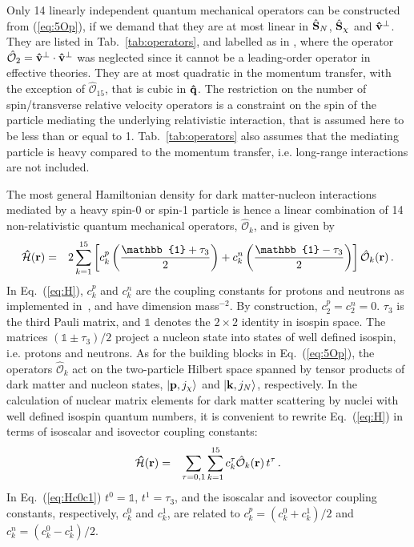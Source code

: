 \documentclass[11pt,a4paper]{article}
\begin{document}
Only 14 linearly independent quantum mechanical operators can be constructed from (\ref{eq:5Op}), if we demand that they are at most linear in $\hat{{\bf{S}}}_N$, $\hat{{\bf{S}}}_\chi$ and $\bf{\hat{v}^{\perp}}$. They are listed in Tab.~\ref{tab:operators}, and labelled as in \cite{Anand:2013yka}, where the operator $\hat{\mathcal{O}}_2={\bf{\hat{v}}}^{\perp}\cdot{\bf{\hat{v}}}^{\perp}$ was neglected since it cannot be a leading-order operator in effective theories. They are at most quadratic in the momentum transfer, with the exception of $\hat{\mathcal{O}}_{15}$, that is cubic in ${\bf{\hat{q}}}$. The restriction on the number of spin/transverse relative velocity operators is a constraint on the spin of the particle mediating the underlying relativistic interaction, that is assumed here to be less than or equal to 1. Tab.~\ref{tab:operators} also assumes that the mediating particle is heavy compared to the momentum transfer, i.e. long-range interactions are not included. 

The most general Hamiltonian density for dark matter-nucleon interactions mediated by a heavy spin-0 or spin-1 particle is hence a linear combination of 14 non-relativistic quantum mechanical operators, $\hat{\mathcal{O}}_k$, and is given by
\begin{eqnarray}
{\bf\hat{\mathcal{H}}}({\bf{r}}) &=& 2 \sum_{k=1}^{15} \left[ c_k^{p} \left( \frac{\mathbb{1}+ \tau_3}{2} \right) + c_k^{n} \left( \frac{\mathbb{1} - \tau_3}{2} \right) \right] \hat{\mathcal{O}}_{k}({\bf{r}}) \,.
\label{eq:H}
\end{eqnarray}
In Eq.~(\ref{eq:H}), $c^{p}_k$ and $c^{n}_k$ are the coupling constants for protons and neutrons as implemented in~\cite{Anand:2013yka}, and have dimension mass$^{-2}$. By construction, $c_2^p=c_2^n=0$. $\tau_3$ is the third Pauli matrix, and $\mathbb{1}$ denotes the $2\times2$ identity in isospin space. The matrices $(\mathbb{1} \pm \tau_{3})/2$ project a nucleon state into states of well defined isospin, i.e. protons and neutrons. As for the building blocks in Eq.~(\ref{eq:5Op}), the operators $\hat{\mathcal{O}}_k$ act on the two-particle Hilbert space spanned by tensor products of dark matter and nucleon states, $|{\bf p},j_\chi\rangle$ and $|{\bf k},j_N\rangle$, respectively. In the calculation of nuclear matrix elements for dark matter scattering by nuclei with well defined isospin quantum numbers, it is convenient to rewrite Eq.~(\ref{eq:H}) in terms of isoscalar and isovector coupling constants:
\begin{eqnarray}
{\bf\hat{\mathcal{H}}}({\bf{r}})&=& \sum_{\tau=0,1} \sum_{k=1}^{15} c_k^{\tau} \hat{\mathcal{O}}_{k}({\bf{r}}) \, t^{\tau} \,.
\label{eq:Hc0c1}
\end{eqnarray}
In Eq.~(\ref{eq:Hc0c1}) $t^0=\mathbb{1}$, $t^1=\tau_3$, and the isoscalar and isovector coupling constants, respectively, $c^0_k$ and $c^{1}_k$, are related to $c^{p}_k=(c^{0}_k+c^{1}_k)/2$ and $c^{n}_k=(c^{0}_k-c^{1}_k)/2$.
\end{document}
